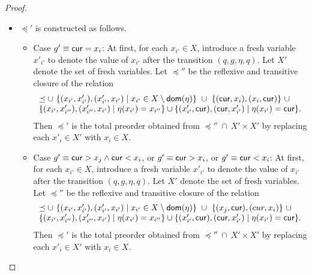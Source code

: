 \begin{appendix}
\begin{proof}
\begin{itemize}
\begin{itemize}
%
%
%
%
\item $\preceq'$ is constructed as follows.
\begin{itemize}
\item Case $g' \equiv \mathsf{cur} = x_i$: At first, for each $x_{i'} \in X$, introduce a fresh variable $x'_{i'}$ to denote the value of $x_{i'}$ after the transition $(q, g, \eta,q)$. Let $X'$ denote the set of fresh variables. Let $\preceq''$ be the reflexive and transitive closure of the relation
\[
\begin{array}{l}
\preceq \cup\ \{(x_{i'}, x'_{i'}), (x'_{i'}, x_{i'}) \mid x_{i'} \in X \setminus \mathsf{dom}(\eta)\}\ \cup\ \{(\mathsf{cur}, x_i), (x_i, \mathsf{cur})\}\ \cup \\
 \{(x_{i'}, x'_{i''}), (x'_{i''}, x_{i'}) \mid \eta(x_{i'})=x_{i''}\} \cup \{(x'_{i'}, \mathsf{cur}), (\mathsf{cur}, x'_{i'}) \mid \eta(x_{i'}) = \mathsf{cur} \}.
\end{array}
\] 
Then $\preceq'$ is the total preorder obtained from $\preceq'' \ \cap\ X' \times X'$ by replacing each $x'_i \in X'$ with $x_i \in X$.

\item Case $g' \equiv \mathsf{cur} > x_j \wedge \mathsf{cur} < x_i$, or $g' \equiv  \mathsf{cur} > x_i$, or $g' \equiv \mathsf{cur} < x_i$:
At first, for each $x_{i'} \in X$, introduce a fresh variable $x'_{i'}$ to denote the value of $x_{i'}$ after the transition $(q, g, \eta,q)$. Let $X'$ denote the set of fresh variables. Let $\preceq''$ be the reflexive and transitive closure of the relation
\[
\begin{array}{l}
\preceq \cup\ \{(x_{i'}, x'_{i'}), (x'_{i'}, x_{i'}) \mid x_{i'} \in X \setminus \mathsf{dom}(\eta)\}\ \cup\ \{(x_j, \mathsf{cur}), (cur, x_i)\}\ \cup \\
\{(x_{i'}, x'_{i''}), (x'_{i''}, x_{i'}) \mid \eta(x_{i'})=x_{i''}\} \cup \{(x'_{i'}, \mathsf{cur}), (\mathsf{cur}, x'_{i'}) \mid \eta(x_{i'}) = \mathsf{cur} \}.
\end{array}
\] 
Then $\preceq'$ is the total preorder obtained from $\preceq'' \ \cap\ X' \times X'$ by replacing each $x'_i \in X'$ with $x_i \in X$.
\end{itemize}
%
%
\end{itemize}


\end{itemize}
\end{proof}
\end{appendix}
